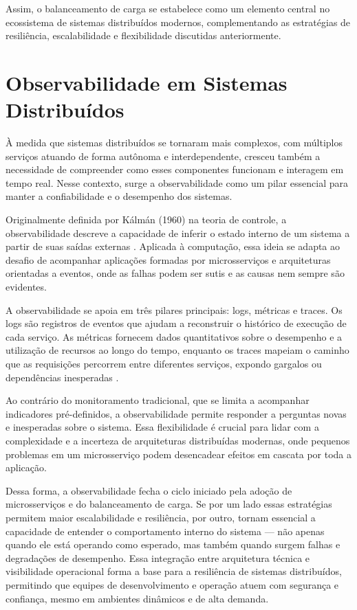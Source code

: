 Assim, o balanceamento de carga se estabelece como um elemento central no ecossistema de sistemas distribuídos modernos, complementando as estratégias de resiliência, escalabilidade e flexibilidade discutidas anteriormente. 

\section{Observabilidade em Sistemas Distribuídos}

À medida que sistemas distribuídos se tornaram mais complexos, com múltiplos serviços atuando de forma autônoma e interdependente, cresceu também a necessidade de compreender como esses componentes funcionam e interagem em tempo real. Nesse contexto, surge a observabilidade como um pilar essencial para manter a confiabilidade e o desempenho dos sistemas.

Originalmente definida por Kálmán (1960) na teoria de controle, a observabilidade descreve a capacidade de inferir o estado interno de um sistema a partir de suas saídas externas \citep{majors2022observability}. Aplicada à computação, essa ideia se adapta ao desafio de acompanhar aplicações formadas por microsserviços e arquiteturas orientadas a eventos, onde as falhas podem ser sutis e as causas nem sempre são evidentes.

A observabilidade se apoia em três pilares principais: logs, métricas e traces. Os logs são registros de eventos que ajudam a reconstruir o histórico de execução de cada serviço. As métricas fornecem dados quantitativos sobre o desempenho e a utilização de recursos ao longo do tempo, enquanto os traces mapeiam o caminho que as requisições percorrem entre diferentes serviços, expondo gargalos ou dependências inesperadas \citep{kuusijarvi2024}.

Ao contrário do monitoramento tradicional, que se limita a acompanhar indicadores pré-definidos, a observabilidade permite responder a perguntas novas e inesperadas sobre o sistema. Essa flexibilidade é crucial para lidar com a complexidade e a incerteza de arquiteturas distribuídas modernas, onde pequenos problemas em um microsserviço podem desencadear efeitos em cascata por toda a aplicação.

Dessa forma, a observabilidade fecha o ciclo iniciado pela adoção de microsserviços e do balanceamento de carga. Se por um lado essas estratégias permitem maior escalabilidade e resiliência, por outro, tornam essencial a capacidade de entender o comportamento interno do sistema — não apenas quando ele está operando como esperado, mas também quando surgem falhas e degradações de desempenho. Essa integração entre arquitetura técnica e visibilidade operacional forma a base para a resiliência de sistemas distribuídos, permitindo que equipes de desenvolvimento e operação atuem com segurança e confiança, mesmo em ambientes dinâmicos e de alta demanda.

